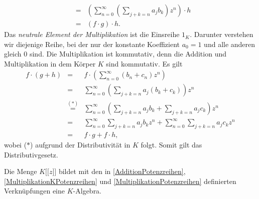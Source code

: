 {\begin{eqnarray*}
&=& \left(\sum_{n=0}^\infty \left(\sum_{j+k=n} a_j b_k\right) z^n\right) \cdot h \\
&=& \left(f \cdot g\right) \cdot h.
\end{eqnarray*} 
Das \textit{neutrale Element der Multiplikation} ist die Einsreihe $1_K$. Darunter verstehen wir diejenige Reihe, bei der nur der konstante Koeffizient $a_0 = 1$ und alle anderen gleich $0$ sind.
Die Multiplikation ist kommutativ, denn die Addition und Multiplikation in dem Körper $K$ sind kommutativ. 
Es gilt
\begin{eqnarray*}
f\cdot \left(g + h\right) &=& f \cdot \left( \sum_{n=0}^\infty \left(b_n + c_n\right) z^n \right)\\
&=& \sum_{n=0}^\infty \left(\sum_{j+k=n} a_j \left(b_k +c_k\right)\right) z^n\\
&\stackrel{\mathrm{(*)}}=& \sum_{n=0}^\infty \left(\sum_{j+k=n} a_j b_k +\sum_{j+k=n} a_j c_k\right) z^n\\
&=& \sum_{n=0}^\infty \sum_{j+k=n} a_j b_k z^n +\sum_{n=0}^\infty \sum_{j+k=n} a_j c_k z^n\\
&=& f\cdot g + f\cdot h,
\end{eqnarray*}
wobei ($*$) aufgrund der Distributivität in $K$ folgt. Somit gilt das Distributivgesetz.\\
 }
%
%
%
%
\begin{bem}
Die Menge $K\lbrack\lbrack z\rbrack\rbrack$ bildet mit den in \ref{AdditionPotenzreihen}, \ref{MultiplikationKPotenzreihen} und \ref{MultiplikationPotenzreihen} definierten Verknüpfungen eine $K$-Algebra.
\end{bem}
%
%
